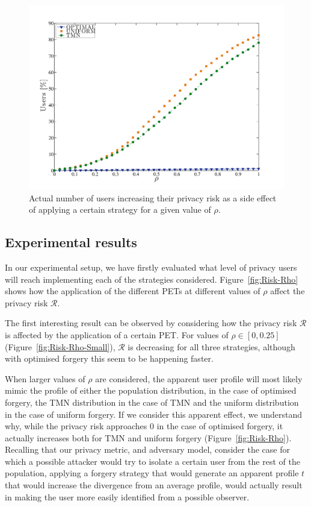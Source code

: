 \begin{figure}[htb]  
\includegraphics[width=\textwidth]{figures/Fig7.pdf}
\caption[Increased privacy risk.]{Actual number of users increasing their privacy risk as a side effect of applying a certain strategy for a given value of $\rho$.
\label{fig:RhoIncr}}
\end{figure}

\subsection{Experimental results}
In our experimental setup, we have firstly evaluated what level of privacy users will reach implementing each of the strategies considered. Figure~\ref{fig:Risk-Rho} shows how the application of the different PETs at different values of $\rho$ affect the privacy risk $\mathcal{R}$.

The first interesting result can be observed by considering how the privacy risk $\mathcal{R}$ is affected by the application of a certain PET. For values of $ \rho \in [0,0.25]$ (Figure~\ref{fig:Risk-Rho-Small}), $\mathcal{R}$ is decreasing for all three strategies, although with optimised forgery this seem to be happening faster.

When larger values of $\rho$ are considered, the apparent user profile will most likely mimic the profile of either the population distribution, in the case of optimised forgery, the TMN distribution in the case of TMN and the uniform distribution in the case of uniform forgery.
If we consider this apparent effect, we understand why, while the privacy risk approaches 0 in the case of optimised forgery, it actually increases both for TMN and uniform forgery (Figure~\ref{fig:Risk-Rho}). Recalling that our privacy metric, and adversary model, consider the case for which a possible attacker would try to isolate a certain user from the rest of the population, applying a forgery strategy that would generate an apparent profile $t$ that would increase the divergence from an average profile, would actually result in making the user more easily identified from a possible observer.

